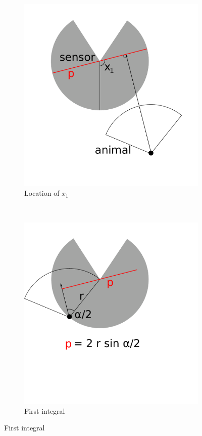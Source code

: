 \documentclass[a4paper,10pt,reqno,oneside]{amsart}
\begin{document}
\begin{figure}[t]
        \centering
	\begin{subfigure}[t]{0.45\textwidth}
                \centering
		\includegraphics[width=1\textwidth]{imgs/x1.pdf}
                \caption{Location of $x_1$ }
                \label{f:x2start}
        \end{subfigure}%
	~ 
	\begin{subfigure}[t]{0.45\textwidth}
                \centering
		\includegraphics[width=1\textwidth]{imgs/integralOne.pdf}
                \caption{First integral}
                \label{f:firstInt}
        \end{subfigure}%
	 

\end{figure}
\end{document}

